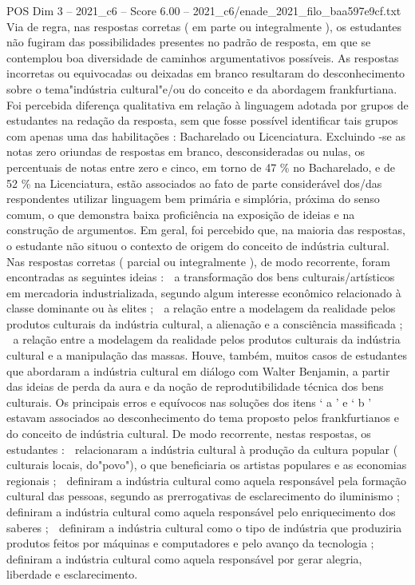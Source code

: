 \begin{textsample}{POS Dim 3 – 2021\_c6 – Score 6.00 – 2021\_c6/enade\_2021\_filo\_baa597e9cf.txt}
Via de regra, nas respostas corretas ( em parte ou integralmente ), os estudantes não fugiram das possibilidades presentes no padrão de resposta, em que se contemplou boa diversidade de caminhos argumentativos possíveis.
As respostas incorretas ou equivocadas ou deixadas em branco resultaram do desconhecimento sobre o tema"indústria cultural"e/ou do conceito e da abordagem frankfurtiana.
Foi percebida diferença qualitativa em relação à linguagem adotada por grupos de estudantes na redação da resposta, sem que fosse possível identificar tais grupos com apenas uma das habilitações : Bacharelado ou Licenciatura.
Excluindo -se as notas zero oriundas de respostas em branco, desconsideradas ou nulas, os percentuais de notas entre zero e cinco, em torno de 47 \% no Bacharelado, e de 52 \% na Licenciatura, estão associados ao fato de parte considerável dos/das respondentes utilizar linguagem bem primária e simplória, próxima do senso comum, o que demonstra baixa proficiência na exposição de ideias e na construção de argumentos.
Em geral, foi percebido que, na maioria das respostas, o estudante não situou o contexto de origem do conceito de indústria cultural.
Nas respostas corretas ( parcial ou integralmente ), de modo recorrente, foram encontradas as seguintes ideias :  a transformação dos bens culturais/artísticos em mercadoria industrializada, segundo algum interesse econômico relacionado à classe dominante ou às elites ;  a relação entre a modelagem da realidade pelos produtos culturais da indústria cultural, a alienação e a consciência massificada ;  a relação entre a modelagem da realidade pelos produtos culturais da indústria cultural e a manipulação das massas.
Houve, também, muitos casos de estudantes que abordaram a indústria cultural em diálogo com Walter Benjamin, a partir das ideias de perda da aura e da noção de reprodutibilidade técnica dos bens culturais.
Os principais erros e equívocos nas soluções dos itens ‘ a ’ e ‘ b ' estavam associados ao desconhecimento do tema proposto pelos frankfurtianos e do conceito de indústria cultural.
De modo recorrente, nestas respostas, os estudantes :  relacionaram a indústria cultural à produção da cultura popular ( culturais locais, do"povo"), o que beneficiaria os artistas populares e as economias regionais ;  definiram a indústria cultural como aquela responsável pela formação cultural das pessoas, segundo as prerrogativas de esclarecimento do iluminismo ;  definiram a indústria cultural como aquela responsável pelo enriquecimento dos saberes ;  definiram a indústria cultural como o tipo de indústria que produziria produtos feitos por máquinas e computadores e pelo avanço da tecnologia ;  definiram a indústria cultural como aquela responsável por gerar alegria, liberdade e esclarecimento.

\end{textsample}
